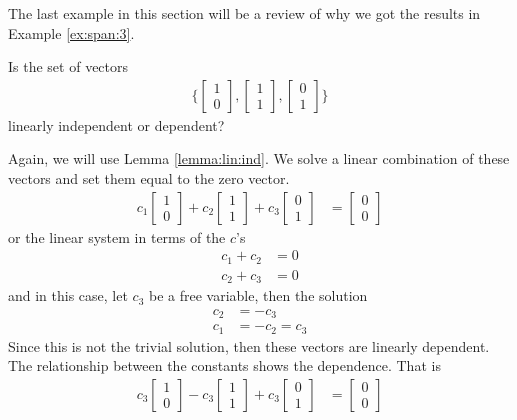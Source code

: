 The last example in this section will be a review of why we got the results in Example \ref{ex:span:3}.

\begin{example}
Is the set of vectors
\begin{align*}
 \biggl\{ \begin{bmatrix}
1 \\ 0
\end{bmatrix}, \begin{bmatrix}
1 \\ 1
\end{bmatrix}, \begin{bmatrix}
0 \\1
\end{bmatrix} \biggr\}
\end{align*}
linearly independent or dependent?

\solution

Again, we will use Lemma \ref{lemma:lin:ind}.  We solve a linear combination of these vectors and set them equal to the zero vector.
%
\begin{align*}
c_1\begin{bmatrix}
1 \\ 0
\end{bmatrix}+c_2 \begin{bmatrix}
1 \\ 1
\end{bmatrix}+c_3 \begin{bmatrix}
0 \\1
\end{bmatrix} & = \begin{bmatrix}
0 \\ 0
\end{bmatrix}
\end{align*}
or the linear system in terms of the $c$'s
%
\begin{align*}
c_1 + c_2 & = 0 \\
c_2 + c_3 & = 0
\end{align*}
and in this case, let $c_3$ be a free variable, then the solution
%
\begin{align*}
c_2 & = -c_3 \\
c_1 & = -c_2 = c_3
\end{align*}
Since this is not the trivial solution, then these vectors are linearly dependent.  The relationship between the constants shows the dependence.  That is
%
\begin{align*}
c_3\begin{bmatrix}
1 \\ 0
\end{bmatrix}-c_3 \begin{bmatrix}
1 \\ 1
\end{bmatrix}+c_3 \begin{bmatrix}
0 \\1
\end{bmatrix} & = \begin{bmatrix}
0 \\ 0
\end{bmatrix}
\end{align*}


\end{example}
